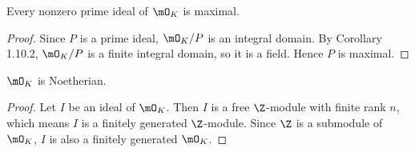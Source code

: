 \documentclass[pmath441]{subfiles}
\begin{document}
    \setcounter{stcounter}{10}
    \setcounter{corcounter}{2}
    \begin{cor}{}
        Every nonzero prime ideal of $\mO_K$ is maximal.
    \end{cor}	

    \begin{proof}
        Since $P$ is a prime ideal, $\mO_K /P$ is an integral domain. By Corollary 1.10.2, $\mO_K /P$ is a finite integral domain, so it is a field. Hence $P$ is maximal.
    \end{proof}

    \begin{cor}{}
        $\mO_K$ is Noetherian.
    \end{cor}	

    \begin{proof}
        Let $I$ be an ideal of $\mO_K$. Then $I$ is a free $\Z$-module with finite rank $n$, which means $I$ is a finitely generated $\Z$-module. Since $\Z$ is a submodule of $\mO_K$, $I$ is also a finitely generated $\mO_K$.
    \end{proof}

    
    
    
    
    
    
    
    
    
    
    
    
    
    
    
    
    
    
    
    
    
    
    
    
    
    
    
    
    
    
    
    
    
    
    
    
    
    
\end{document}
